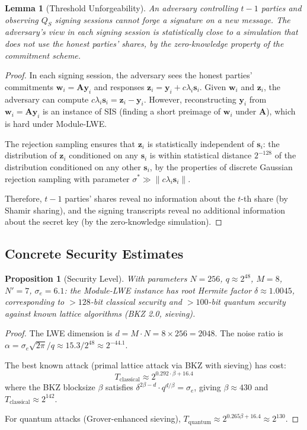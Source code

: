 \documentclass[11pt,a4paper]{article}
\newtheorem{lemma}[theorem]{Lemma}
\newtheorem{proposition}[theorem]{Proposition}
\begin{document}
\begin{lemma}[Threshold Unforgeability]
\label{lem:threshold}
An adversary controlling $t-1$ parties and observing $Q_S$ signing sessions cannot
forge a signature on a new message. The adversary's view in each signing session
is statistically close to a simulation that does not use the honest parties' shares,
by the zero-knowledge property of the commitment scheme.
\end{lemma}

\begin{proof}
In each signing session, the adversary sees the honest parties' commitments
$\mathbf{w}_i = \mathbf{A}\mathbf{y}_i$ and responses $\mathbf{z}_i = \mathbf{y}_i + c \lambda_i \mathbf{s}_i$.
Given $\mathbf{w}_i$ and $\mathbf{z}_i$, the adversary can compute $c \lambda_i \mathbf{s}_i = \mathbf{z}_i - \mathbf{y}_i$.
However, reconstructing $\mathbf{y}_i$ from $\mathbf{w}_i = \mathbf{A}\mathbf{y}_i$ is
an instance of SIS (finding a short preimage of $\mathbf{w}_i$ under $\mathbf{A}$), which
is hard under Module-LWE.

The rejection sampling ensures that $\mathbf{z}_i$ is statistically independent of
$\mathbf{s}_i$: the distribution of $\mathbf{z}_i$ conditioned on any $\mathbf{s}_i$
is within statistical distance $2^{-128}$ of the distribution conditioned on any other
$\mathbf{s}_i$, by the properties of discrete Gaussian rejection sampling with parameter
$\sigma^* \gg \|c \lambda_i \mathbf{s}_i\|$.

Therefore, $t-1$ parties' shares reveal no information about the $t$-th share (by Shamir
sharing), and the signing transcripts reveal no additional information about the secret
key (by the zero-knowledge simulation).
\end{proof}

\subsection{Concrete Security Estimates}

\begin{proposition}[Security Level]
\label{prop:security-level}
With parameters $N = 256$, $q \approx 2^{48}$, $M = 8$, $N' = 7$, $\sigma_e = 6.1$:
the Module-LWE instance has root Hermite factor $\delta \approx 1.0045$, corresponding
to $> 128$-bit classical security and $> 100$-bit quantum security against known
lattice algorithms (BKZ 2.0, sieving).
\end{proposition}

\begin{proof}
The LWE dimension is $d = M \cdot N = 8 \times 256 = 2048$. The noise ratio is
$\alpha = \sigma_e \sqrt{2\pi} / q \approx 15.3 / 2^{48} \approx 2^{-44.1}$.

The best known attack (primal lattice attack via BKZ with sieving) has cost:
\[
T_{\text{classical}} \approx 2^{0.292 \cdot \beta + 16.4}
\]
where the BKZ blocksize $\beta$ satisfies $\delta^{2\beta - d} \cdot q^{d/\beta} = \sigma_e$,
giving $\beta \approx 430$ and $T_{\text{classical}} \approx 2^{142}$.

For quantum attacks (Grover-enhanced sieving), $T_{\text{quantum}} \approx 2^{0.265\beta + 16.4} \approx 2^{130}$.
\end{proof}
\end{document}
